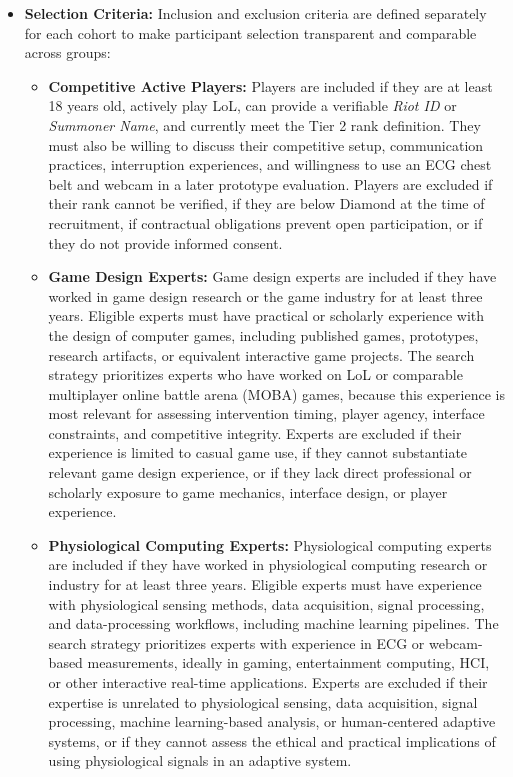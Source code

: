 \begin{itemize}
    \item \textbf{Selection Criteria:} Inclusion and exclusion criteria are defined separately for each cohort to make participant selection transparent and comparable across groups:
    \begin{itemize}
        \item \textbf{Competitive Active Players:} Players are included if they are at least 18 years old, actively play LoL, can provide a verifiable \textit{Riot ID} or \textit{Summoner Name}, and currently meet the Tier 2 rank definition. They must also be willing to discuss their competitive setup, communication practices, interruption experiences, and willingness to use an ECG chest belt and webcam in a later prototype evaluation. Players are excluded if their rank cannot be verified, if they are below Diamond at the time of recruitment, if contractual obligations prevent open participation, or if they do not provide informed consent.
        \item \textbf{Game Design Experts:} Game design experts are included if they have worked in game design research or the game industry for at least three years. Eligible experts must have practical or scholarly experience with the design of computer games, including published games, prototypes, research artifacts, or equivalent interactive game projects. The search strategy prioritizes experts who have worked on LoL or comparable multiplayer online battle arena (MOBA) games, because this experience is most relevant for assessing intervention timing, player agency, interface constraints, and competitive integrity. Experts are excluded if their experience is limited to casual game use, if they cannot substantiate relevant game design experience, or if they lack direct professional or scholarly exposure to game mechanics, interface design, or player experience.
        \item \textbf{Physiological Computing Experts:} Physiological computing experts are included if they have worked in physiological computing research or industry for at least three years. Eligible experts must have experience with physiological sensing methods, data acquisition, signal processing, and data-processing workflows, including machine learning pipelines. The search strategy prioritizes experts with experience in ECG or webcam-based measurements, ideally in gaming, entertainment computing, HCI, or other interactive real-time applications. Experts are excluded if their expertise is unrelated to physiological sensing, data acquisition, signal processing, machine learning-based analysis, or human-centered adaptive systems, or if they cannot assess the ethical and practical implications of using physiological signals in an adaptive system.
    \end{itemize}


\end{itemize}
